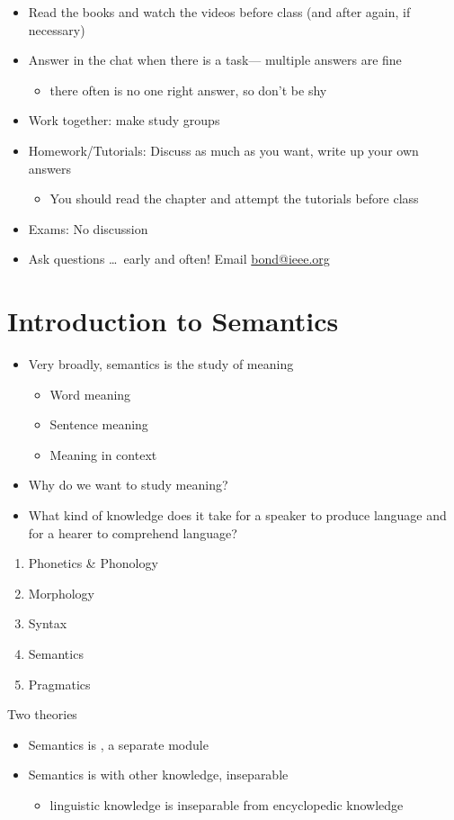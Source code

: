 \documentclass[headrule,footrule]{foils}
\begin{document}
\begin{itemize}
\item Read the books and watch the videos before class (and after again, if necessary)
\item Answer in the chat when there is a task\task --- multiple
  answers are fine 
  \begin{itemize}
  \item there often is no one right answer, so don't be shy
  \end{itemize}
\item Work together: make study groups
\item Homework/Tutorials: Discuss as much as you want, write up your own answers
  \begin{itemize}
  \item You should read the chapter and attempt the tutorials before class
  \end{itemize}
\item Exams: No discussion
\item Ask questions \ldots\ early and often! Email \url{bond@ieee.org}
\end{itemize}

\section{Introduction to Semantics}

\begin{itemize}
\item Very broadly, semantics is the study of meaning
  \begin{itemize}
  \item Word meaning
  \item Sentence meaning
  \item Meaning in context
  \end{itemize}
\item Why do we want to study meaning?
\item What kind of knowledge does it take for a speaker to produce language and for a hearer to comprehend language? 
\end{itemize}

\begin{enumerate}\addtolength{\itemsep}{-0.75ex}
\item Phonetics \& Phonology
\item Morphology
\item Syntax
\item Semantics
\item Pragmatics
\end{enumerate}
Two theories
\begin{itemize}
\item Semantics is , a separate module
\item Semantics is  with other knowledge, inseparable
  \begin{itemize}
  \item linguistic knowledge is inseparable from encyclopedic knowledge
  \end{itemize}
\end{itemize}
\end{document}
